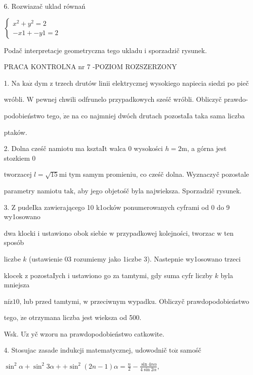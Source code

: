 \documentclass[a4paper,12pt]{article}
\begin{document}
6. Rozwiazač uklad równań

$\left\{\begin{array}{l}
x^{2}+y^{2}=2\\
- x1+-y1=2
\end{array}\right.$

Podač interpretacje geometryczna tego ukladu i sporzadzič rysunek.




PRACA KONTROLNA nr 7 -POZIOM ROZSZERZONY

1. Na $\mathrm{k}\mathrm{a}\dot{\mathrm{z}}$ dym $\mathrm{z}$ trzech drutów linii elektrycznej wysokiego napiecia siedzi po pieč

wróbli. $\mathrm{W}$ pewnej chwili odfrunelo przypadkowych sześč wróbli. Obliczyč prawdo-

podobieństwo tego, $\dot{\mathrm{z}}\mathrm{e}$ na co najmniej dwóch drutach pozostaIa taka sama liczba

ptaków.

2. Dolna cześč namiotu ma ksztaIt walca $0$ wysokości $h=2\mathrm{m}$, a górna jest stozkiem $0$

tworzacej $l=\sqrt{15}\mathrm{m}\mathrm{i}$ tym samym promieniu, co cześč dolna. Wyznaczyč pozostale

parametry namiotu $\mathrm{t}\mathrm{a}\mathrm{k}$, aby jego objetośč byla najwieksza. Sporzadzič rysunek.

3. $\mathrm{Z}$ pudeIka zawierającego 10 k1ocków ponumerowanych cyframi od 0 do 9 wy1osowano

dwa klocki $\mathrm{i}$ ustawiono obok siebie $\mathrm{w}$ przypadkowej kolejności, tworzac $\mathrm{w}$ ten sposób

liczbe $k$ (ustawienie 03 rozumiemy jako 1iczbe 3). Nastepnie wy1osowano trzeci

klocek $\mathrm{z}$ pozostaIych $\mathrm{i}$ ustawiono go za tamtymi, gdy suma cyfr liczby $k$ byla mniejsza

$\mathrm{n}\mathrm{i}\dot{\mathrm{z}}10$, lub przed tamtymi, $\mathrm{w}$ przeciwnym wypadku. Obliczyč prawdopodobieństwo

tego, $\dot{\mathrm{z}}\mathrm{e}$ otrzymana liczba jest wieksza od 500.

Wsk. $\mathrm{U}\dot{\mathrm{z}}$ yč wzoru na prawdopodobieństwo catkowite.

4. Stosujac zasade indukcji matematycznej, udowodnič $\mathrm{t}\mathrm{o}\dot{\mathrm{z}}$ samośč

$\sin^{2}\alpha+\sin^{2}3\alpha+ +\displaystyle \sin^{2}(2n-1)\alpha=\frac{n}{2}-\frac{\sin 4n\alpha}{4\sin 2\alpha},$
\end{document}
